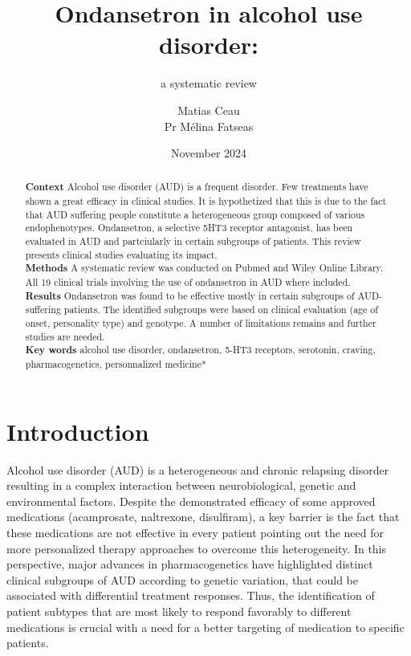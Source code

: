 \documentclass[
  12pt,
]{article}
\title{\textbf{Ondansetron in alcohol use disorder:}}
\subtitle{a systematic review}
\author{Matias Ceau\\
Pr Mélina Fatseas}
\date{November 2024}
\begin{document}
\maketitle
\begin{abstract}
\textbf{Context} Alcohol use disorder (AUD) is a frequent disorder. Few
treatments have shown a great efficacy in clinical studies. It is
hypothetized that this is due to the fact that AUD suffering people
constitute a heterogeneous group composed of various endophenotypes.
Ondansetron, a selective 5HT3 receptor antagonist, has been evaluated in
AUD and partciularly in certain subgroups of patients. This review
presents clinical studies evaluating its impact.\\
\textbf{Methods} A systematic review was conducted on Pubmed and Wiley
Online Library. All 19 clinical trials involving the use of ondansetron
in AUD where included.\\
\textbf{Results} Ondansetron was found to be effective mostly in certain
subgroups of AUD-suffering patients. The identified subgroups were based
on clinical evaluation (age of onset, personality type) and genotype. A
number of limitations remains and further studies are needed.\\
\textbf{Key words} alcohol use disorder, ondansetron, 5-HT3 receptors,
serotonin, craving, pharmacogenetics, personnalized medicine*
\end{abstract}

{
\setcounter{tocdepth}{3}
\tableofcontents
}
\section{Introduction}\label{introduction}

Alcohol use disorder (AUD) is a heterogeneous and chronic relapsing
disorder resulting in a complex interaction between neurobiological,
genetic and environmental factors. Despite the demonstrated efficacy of
some approved medications (acamprosate, naltrexone, disulfiram), a key
barrier is the fact that these medications are not effective in every
patient pointing out the need for more personalized therapy approaches
to overcome this heterogeneity. In this perspective, major advances in
pharmacogenetics have highlighted distinct clinical subgroups of AUD
according to genetic variation, that could be associated with
differential treatment responses. Thus, the identification of patient
subtypes that are most likely to respond favorably to different
medications is crucial with a need for a better targeting of medication
to specific patients.
\end{document}
